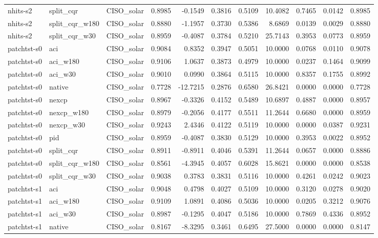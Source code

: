 \begin{tabular}{lllrrrrrrrr}
nhits-s2 & split_cqr & CISO_solar & 0.8985 & -0.1549 & 0.3816 & 0.5109 & 10.4082 & 0.7465 & 0.0142 & 0.8985 \\
nhits-s2 & split_cqr_w180 & CISO_solar & 0.8880 & -1.1957 & 0.3730 & 0.5386 & 8.6869 & 0.0139 & 0.0029 & 0.8880 \\
nhits-s2 & split_cqr_w30 & CISO_solar & 0.8959 & -0.4087 & 0.3784 & 0.5210 & 25.7143 & 0.3953 & 0.0773 & 0.8959 \\
patchtst-s0 & aci & CISO_solar & 0.9084 & 0.8352 & 0.3947 & 0.5051 & 10.0000 & 0.0768 & 0.0110 & 0.9078 \\
patchtst-s0 & aci_w180 & CISO_solar & 0.9106 & 1.0637 & 0.3873 & 0.4979 & 10.0000 & 0.0237 & 0.1464 & 0.9099 \\
patchtst-s0 & aci_w30 & CISO_solar & 0.9010 & 0.0990 & 0.3864 & 0.5115 & 10.0000 & 0.8357 & 0.1755 & 0.8992 \\
patchtst-s0 & native & CISO_solar & 0.7728 & -12.7215 & 0.2876 & 0.6580 & 26.8421 & 0.0000 & 0.0000 & 0.7728 \\
patchtst-s0 & nexcp & CISO_solar & 0.8967 & -0.3326 & 0.4152 & 0.5489 & 10.6897 & 0.4887 & 0.0000 & 0.8957 \\
patchtst-s0 & nexcp_w180 & CISO_solar & 0.8979 & -0.2056 & 0.4177 & 0.5511 & 11.2644 & 0.6680 & 0.0000 & 0.8959 \\
patchtst-s0 & nexcp_w30 & CISO_solar & 0.9243 & 2.4346 & 0.4122 & 0.5119 & 10.0000 & 0.0000 & 0.0387 & 0.9231 \\
patchtst-s0 & pid & CISO_solar & 0.8959 & -0.4087 & 0.3830 & 0.5129 & 10.0000 & 0.3953 & 0.0022 & 0.8952 \\
patchtst-s0 & split_cqr & CISO_solar & 0.8911 & -0.8911 & 0.4046 & 0.5391 & 11.2644 & 0.0657 & 0.0000 & 0.8886 \\
patchtst-s0 & split_cqr_w180 & CISO_solar & 0.8561 & -4.3945 & 0.4057 & 0.6028 & 15.8621 & 0.0000 & 0.0000 & 0.8538 \\
patchtst-s0 & split_cqr_w30 & CISO_solar & 0.9038 & 0.3783 & 0.3831 & 0.5116 & 10.0000 & 0.4261 & 0.0242 & 0.9023 \\
patchtst-s1 & aci & CISO_solar & 0.9048 & 0.4798 & 0.4027 & 0.5109 & 10.0000 & 0.3120 & 0.0278 & 0.9020 \\
patchtst-s1 & aci_w180 & CISO_solar & 0.9109 & 1.0891 & 0.4086 & 0.5036 & 10.0000 & 0.0205 & 0.3212 & 0.9076 \\
patchtst-s1 & aci_w30 & CISO_solar & 0.8987 & -0.1295 & 0.4047 & 0.5186 & 10.0000 & 0.7869 & 0.4336 & 0.8952 \\
patchtst-s1 & native & CISO_solar & 0.8167 & -8.3295 & 0.3461 & 0.6495 & 27.5000 & 0.0000 & 0.0000 & 0.8147 \\

\end{tabular}
